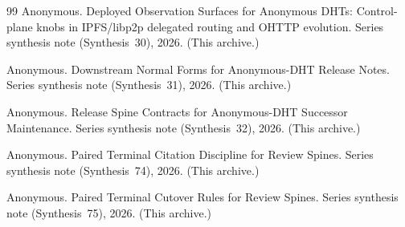 \documentclass[11pt]{article}
\begin{document}
\begin{thebibliography}{99}
Anonymous.
\newblock Deployed Observation Surfaces for Anonymous DHTs: Control-plane knobs in IPFS/libp2p delegated routing and OHTTP evolution.
\newblock Series synthesis note (Synthesis~30), 2026. (This archive.)

Anonymous.
\newblock Downstream Normal Forms for Anonymous-DHT Release Notes.
\newblock Series synthesis note (Synthesis~31), 2026. (This archive.)

Anonymous.
\newblock Release Spine Contracts for Anonymous-DHT Successor Maintenance.
\newblock Series synthesis note (Synthesis~32), 2026. (This archive.)

Anonymous.
\newblock Paired Terminal Citation Discipline for Review Spines.
\newblock Series synthesis note (Synthesis~74), 2026. (This archive.)

Anonymous.
\newblock Paired Terminal Cutover Rules for Review Spines.
\newblock Series synthesis note (Synthesis~75), 2026. (This archive.)

\end{thebibliography}
\end{document}
